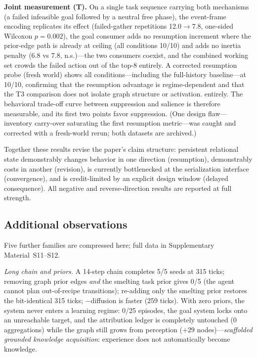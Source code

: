 \documentclass[10pt,a4paper]{article}
\begin{document}
\textbf{Joint measurement (T).} On a single task sequence carrying
both mechanisms (a failed infeasible goal followed by a neutral free
phase), the event-frame encoding replicates its effect
(failed-gather repetitions 12.0$\rightarrow$7.8, one-sided Wilcoxon
$p{=}0.002$), the goal consumer adds no resumption increment where the
prior-edge path is already at ceiling (all conditions 10/10) and adds
no inertia penalty (6.8 vs 7.8, n.s.)---the two consumers coexist, and
the combined working set crowds the failed action out of the top-8
entirely. A corrected resumption probe (fresh world) shows all
conditions---including the full-history baseline---at 10/10, confirming
that the resumption advantage is regime-dependent and that the T3
comparison does not isolate graph structure or activation.
entirely. The behavioral trade-off curve between suppression and
salience is therefore measurable, and its first two points favor
suppression. (One design flaw---inventory carry-over saturating the
first resumption metric---was caught and corrected with a fresh-world
rerun; both datasets are archived.)

Together these results revise the paper's claim structure: persistent
relational state demonstrably changes behavior in one direction
(resumption), demonstrably costs in another (revision), is currently
bottlenecked at the serialization interface (convergence), and is
credit-limited by an explicit design window (delayed consequence).
All negative and reverse-direction results are reported at full
strength.

\subsection{Additional observations}
\label{sec:res-system}
Five further families are compressed here; full data in Supplementary Material~S11--S12.

\emph{Long chain and priors.} A 14-step chain completes 5/5 seeds at 315 ticks; removing graph prior edges \emph{and} the smelting task prior gives 0/5 (the agent cannot plan out-of-recipe transitions); re-adding only the smelting prior restores the bit-identical 315 ticks; $-$diffusion is faster (259 ticks). With zero priors, the system never enters a learning regime: 0/25 episodes, the goal system locks onto an unreachable target, and the attribution ledger is completely untouched (0 aggregations) while the graph still grows from perception ($+29$ nodes)---\emph{scaffolded grounded knowledge acquisition}: experience does not automatically become knowledge.
\end{document}
